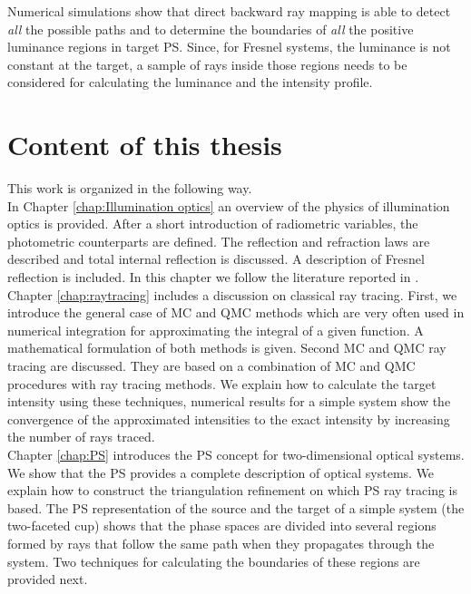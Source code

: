 Numerical simulations show that direct backward ray mapping is able to detect \textit{all} the possible paths and to determine the boundaries of \textit{all} the positive luminance regions in target PS. Since, for Fresnel systems, the luminance is not constant at the target, a sample of rays inside those regions needs to be considered for calculating the luminance and the intensity profile.
\section{Content of this thesis}
This work is organized in the following way.\\ \indent
In Chapter \ref{chap:Illumination optics} an overview of the physics of illumination optics is provided. After a short introduction of radiometric variables, the photometric counterparts are defined. The reflection and refraction laws are described and total internal reflection is discussed. A description of Fresnel reflection is included. In this chapter we follow the literature reported in \cite{hecht1998hecht, feynman2011feynman, feynman1964feynman}.\\ \indent
Chapter \ref{chap:raytracing} includes a discussion on classical ray tracing. First, we introduce the general case of MC and QMC methods which are very often used in numerical integration for approximating the integral of a given function. A mathematical formulation of both methods is given. Second MC and QMC ray tracing are discussed. They are based on a combination of MC and QMC procedures with ray tracing methods. We explain how to calculate the target intensity using these techniques, numerical results for a simple system show the convergence of the approximated intensities to the exact intensity by increasing the number of rays traced.\\\indent
Chapter \ref{chap:PS} introduces the PS concept for two-dimensional optical systems. We show that the PS provides a complete description of optical systems. We explain how to construct the triangulation refinement on which PS ray tracing is based. The PS representation of the source and the target of a simple system (the two-faceted cup) shows that the phase spaces are divided into several regions formed by rays that follow the same path when they propagates through the system. Two techniques for calculating the boundaries of these regions are provided next. \\ \indent 
